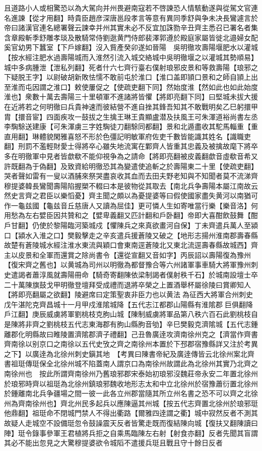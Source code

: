 且道路小人或相驚恐以為大駕向并州畏避南寇若不啓諫恐人情駭動遂與從駕文官連名進諫【從才用翻】時貴臣趙彦深唐邕段孝言等意有異同季舒與争未决長鸞遽言於帝曰諸漢官連名總署聲云諫幸并州其實未必不反宜加誅勠辛丑齊主悉召已署名者集含章殿斬季舒雕孝琰及散騎常侍劉逖黄門侍郎裴澤郭遵於殿庭家屬皆徙北邉婦女配奚官幼男下蠶室【下戶嫁翻】沒入貲產癸卯遂如晉陽　吳明徹攻壽陽堰肥水以灌城【按水經注肥水過壽陽城而入淮然引流入城交絡城中吳明徹堰之以灌城其勢順易】城中多病腫泄【泄私列翻】死者什六七齊行臺右僕射琅邪皮景和等救壽陽【琅邪之下疑脱王字】以尉破胡新敗怯懦不敢前屯於淮口【淮口盖即頴口景和之師自頴上出至淮而屯因謂之淮口】敕使屢促之【使疏吏翻下同】然始度淮【然如此也如此始度淮也】衆數十萬去壽陽三十里頓軍不進諸將皆懼【將即亮翻下同】曰堅城未拔大援在近將若之何明徹曰兵貴神速而彼結營不進自挫其鋒吾知其不敢戰明矣乙巳躬擐甲胄【擐音宦】四面疾攻一鼓拔之生擒王琳王貴顯盧潜及扶風王可朱渾道裕尚書左丞李騊駼送建康【可朱渾虜三字姓騊徒刀翻駼同都翻】景和北遁盡收其駝馬輜重【重直用翻】琳體貌閑雅喜怒不形於色彊記明敏軍府佐吏千數皆能識其姓名【識職吏翻】刑罰不濫輕財愛士得將卒心雖失地流寓在鄴齊人皆重其忠義及被擒故麾下將卒多在明徹軍中見者皆歔欷不能仰視争為之請命【將即亮翻被皮義翻歔音虛欷音希又許既翻為于偽翻】及致資給明徹恐其為變遣使追斬之於壽陽東二十里【使疏吏翻】哭者聲如雷有一叟以酒脯來祭哭盡哀收其血而去田夫野老知與不知聞者莫不流涕齊穆提婆韓長鸞聞壽陽陷握槊不輟曰本是彼物從其取去【南北兵争壽陽本屬江南故云然史言齊之君臣以樂慆憂】齊主聞之頗以為憂提婆等曰假使國家盡失黄河以南猶可作一龜兹國【龜兹音丘慈唐人又讀為屈佳】更可憐人生如寄唯當行樂【樂音洛】何用愁為左右嬖臣因共贊和之【嬖卑義翻又匹計翻和戶卧翻】帝即大喜酣飲鼓舞【酣戶甘翻】仍使於黎陽臨河築城戍【懼陳兵之來真欲畫河自保】丁未齊遣兵萬人至潁口【潁水入淮之口】樊毅擊走之辛亥遣兵援蒼陵又破之【地形志揚州淮南郡壽春縣故楚有蒼陵城水經注淮水東流與穎口會東南逕蒼陵北又東北流逕壽春縣故城西】齊主以皮景和全軍而還賞之除尚書令【還從宣翻又音如字】丙辰詔以壽陽復為豫州【復宋齊之舊也】以黄城為司州以明徹為都督豫合等六州諸軍事車騎大將軍豫州刺史遣謁者蕭淳風就壽陽冊命【騎奇寄翻陳依梁制謁者僕射秩千石】於城南設壇士卒二十萬陳旗鼓戈甲明徹登壇拜受成禮而退將卒榮之上置酒舉杯屬徐陵曰賞卿知人【將即亮翻屬之欲翻】陵避席曰定策聖衷非臣力也以黄法為征西大將軍合州刺史戊午湛陀克齊昌城十一月甲戍淮隂城降【五代志江都郡山陽縣有淮隂郡巨俱翻降戶江翻】庚辰威虜將軍劉桃枝克朐山城【陳制威虜將軍品第八秩六百石此劉桃枝自是陳將非齊之劉桃枝五代志東海郡有朐山縣朐音劬】辛巳樊毅克濟隂城【五代志鍾離郡化明縣故曰睢陵置濟隂郡濟子禮翻】己丑魯廣逹攻濟南徐州克之【濟當作齊書齊南徐以别京口之南徐以五代史攷之齊之南徐州本置於下邳郡宿豫縣詳又注於考異之下】以廣逹為北徐州刺史鎭其地　【考異曰陳書帝紀及廣逹傳皆云北徐州案北齊書祖珽傳珽保全北徐州城不陷蓋南人謂京口為南徐州故謂此為北徐州其實乃北齊之南徐州也　按此所謂齊南徐州乃舊琅邪郡宋泰始初琅邪沒魏莊帝永安二年置北徐州於琅邪時齊以祖珽為北徐州鎮琅邪魏收地形志太和中立北徐州於宿豫蕭衍置北徐州於鍾離南北兵争疆場之間一彼一此各立州郡當隨其所立州名書之恐不可以齊之北徐州為齊南徐州也】齊北州民多起兵以應陳逼其州城【按五代志齊置北徐州於琅邪珽他鼎翻】祖珽命不閉城門禁人不得出衢路【爾雅四逹謂之衢】城中寂然反者不測其故疑人走城空不設備珽忽令鼓譟震天反者皆驚走既而復結陳向城【復扶又翻陳讀曰陣】珽令錄事參軍王君植將兵拒之自乘馬臨陳左右射【射食亦翻】反者先聞其盲謂其必不能出忽見之大驚穆提婆欲令城䧟不遣援兵珽且戰且守十餘日反者